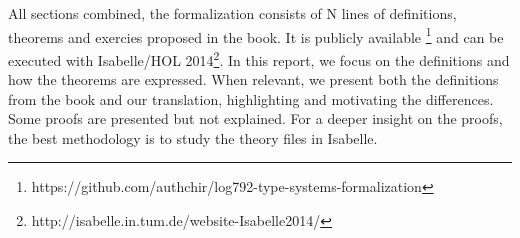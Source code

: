 All sections combined, the formalization consists of N lines of definitions, theorems and exercies
proposed in the book. It is publicly available
\footnote{https://github.com/authchir/log792-type-systems-formalization} and can be executed with
Isabelle/HOL 2014\footnote{http://isabelle.in.tum.de/website-Isabelle2014/}. In this report, we
focus on the definitions and how the theorems are expressed. When relevant, we present both the
definitions from the book and our translation, highlighting and motivating the differences. Some
proofs are presented but not explained. For a deeper insight on the proofs, the best methodology is
to study the theory files in Isabelle.


